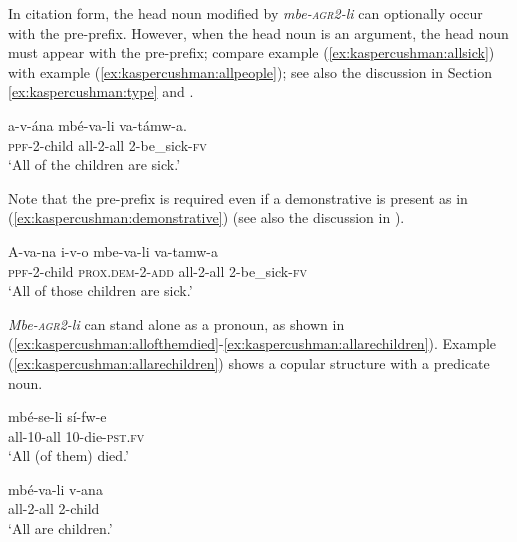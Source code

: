 \documentclass[output=paper,modfonts,nonflat]{langsci/langscibook}
\begin{document}
In citation form, the head noun modified by \textit{mbe-\textsc{agr2}-li} can optionally occur with the pre-prefix.  However, when the head noun is an argument, the head noun must appear with the pre-prefix; compare example (\ref{ex:kaspercushman:allsick}) with example (\ref{ex:kaspercushman:allpeople}); see also the discussion in Section \ref{ex:kaspercushman:type} and \citealt{gambarage16}. 
 
\begin{exe}
\ex 
\gll a-v-ána mbé-va-li va-támw-a. \\
\textsc{ppf}-2-child all-2-all 2-be\_sick-\textsc{fv} \\
\glt `All of the children are sick.' \\ \label{ex:kaspercushman:allsick}
\end{exe}

Note that the pre-prefix is required even if a demonstrative is present as in (\ref{ex:kaspercushman:demonstrative}) (see also the discussion in \citealt[32--33]{Matthewson2013}). 
\begin{exe}

\ex \label{ex:kaspercushman:demonstrative}
\gll A-va-na i-v-o mbe-va-li va-tamw-a \\
\textsc{ppf}-2-child \textsc{prox.dem}-2-\textsc{add} all-2-all 2-be\_sick-\textsc{fv} \\
\glt `All of those children are sick.' \\
\end{exe}


\textit{Mbe-\textsc{agr2}-li} can stand alone as a pronoun, as shown in (\ref{ex:kaspercushman:allofthemdied}-\ref{ex:kaspercushman:allarechildren}).  Example (\ref{ex:kaspercushman:allarechildren}) shows a copular structure with a predicate noun. 

\begin{exe}
\ex \label{ex:kaspercushman:allofthemdied} 
\gll mbé-se-li sí-fw-e \\ 
all-10-all 10-die-\textsc{pst}.\textsc{fv} \\
\glt `All (of them) died.' 

\end{exe}

\begin{exe}
\ex \label{ex:kaspercushman:allarechildren} 
\gll mbé-va-li v-ana \\
all-2-all 2-child \\
\glt `All are children.'
\end{exe}
\end{document}
